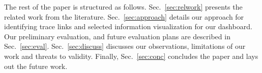 

The rest of the paper is structured as follows. Sec.~\ref{sec:relwork} presents the related work from the literature. Sec.~\ref{sec:approach} details our approach for identifying trace links and selected information visualization for our dashboard. Our preliminary evaluation, and future evaluation plans are described in Sec.~\ref{sec:eval}. Sec.~\ref{sec:discuss} discusses our observations, limitations of our work and threats to validity. Finally, Sec.~\ref{sec:conc} concludes the paper and lays out the future work.

